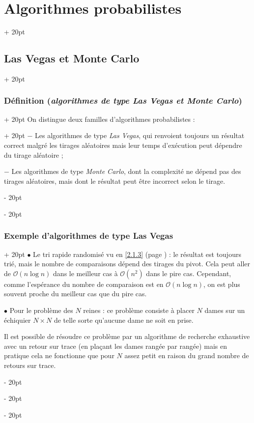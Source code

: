 \documentclass[a4paper, 12pt, twoside]{article}
\newcommand{\ind}[1][20pt]{\advance\leftskip + #1}
\newcommand{\deind}[1][20pt]{\advance\leftskip - #1}
\newenvironment{indt}[2][20pt]{#2 \par \ind[#1]}{\par \deind} %
\newcommand{\1}{\mathbbm 1}
\begin{document}
\begin{indt}{\section{Algorithmes probabilistes}}
        \begin{indt}{\subsection{Las Vegas et Monte Carlo}}
            \begin{indt}{\subsubsection{Définition (\textit{algorithmes de type Las Vegas et Monte Carlo})}}
                \begin{indt}{On distingue deux familles d'algorithmes probabilistes :}
                    $-$ Les algorithmes de type \emph{Las Vegas}, qui renvoient toujours un résultat correct malgré les tirages aléatoires mais leur temps d'exécution peut dépendre du tirage aléatoire ;

                    $-$ Les algorithmes de type \emph{Monte Carlo}, dont la complexité ne dépend pas des tirages aléatoires, mais dont le résultat peut être incorrect selon le tirage.
                \end{indt}
            \end{indt}

            \vspace{12pt}
            
            \begin{indt}{\subsubsection{Exemple d'algorithmes de type Las Vegas}}
                $\bullet$ Le tri rapide randomisé vu en \ref{2.1.3} (page \pageref{2.1.3}) : le résultat est toujours trié, mais le nombre de comparaisons dépend des tirages du pivot.
                Cela peut aller de $\mathcal O(n\log n)$ dans le meilleur cas à $\mathcal O(n^2)$ dans le pire cas.
                Cependant, comme l'espérance du nombre de comparaison est en $\mathcal O(n\log n)$, on est plus souvent proche du meilleur cas que du pire cas.

                \vspace{12pt}
                
                $\bullet$ Pour le problème des $N$ reines : ce problème consiste à placer $N$ dames sur un échiquier $N \times N$ de telle sorte qu'aucune dame ne soit en prise.

                Il est possible de résoudre ce problème par un algorithme de recherche exhaustive avec un retour sur trace (en plaçant les dames rangée par rangée) mais en pratique cela ne fonctionne que pour $N$ assez petit en raison du grand nombre de retours sur trace.


\end{indt}
\end{indt}
\end{indt}
\end{document}
